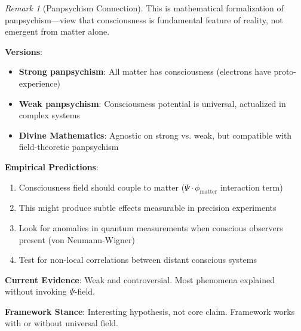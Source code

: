 \documentclass[11pt,a4paper]{article}
\theoremstyle{definition}
\theoremstyle{remark}
\newtheorem{remark}{Remark}[section]
\begin{document}
\begin{small}
\begin{enumerate}
\begin{remark}[Panpsychism Connection]
This is mathematical formalization of panpsychism—view that consciousness is fundamental feature of reality, not emergent from matter alone.

\textbf{Versions}:
\begin{itemize}
    \item \textbf{Strong panpsychism}: All matter has consciousness (electrons have proto-experience)
    \item \textbf{Weak panpsychism}: Consciousness potential is universal, actualized in complex systems
    \item \textbf{Divine Mathematics}: Agnostic on strong vs. weak, but compatible with field-theoretic panpsychism
\end{itemize}

\textbf{Empirical Predictions}:
\begin{enumerate}
    \item Consciousness field should couple to matter (\(\Psi \cdot \phi_{\text{matter}}\) interaction term)
    \item This might produce subtle effects measurable in precision experiments
    \item Look for anomalies in quantum measurements when conscious observers present (von Neumann-Wigner)
    \item Test for non-local correlations between distant conscious systems
\end{enumerate}

\textbf{Current Evidence}: Weak and controversial. Most phenomena explained without invoking \(\Psi\)-field.

\textbf{Framework Stance}: Interesting hypothesis, not core claim. Framework works with or without universal field.
\end{remark}

\begin{figure}[H]
\centering
{}
\end{figure}
\end{enumerate}
\end{small}
\end{document}
